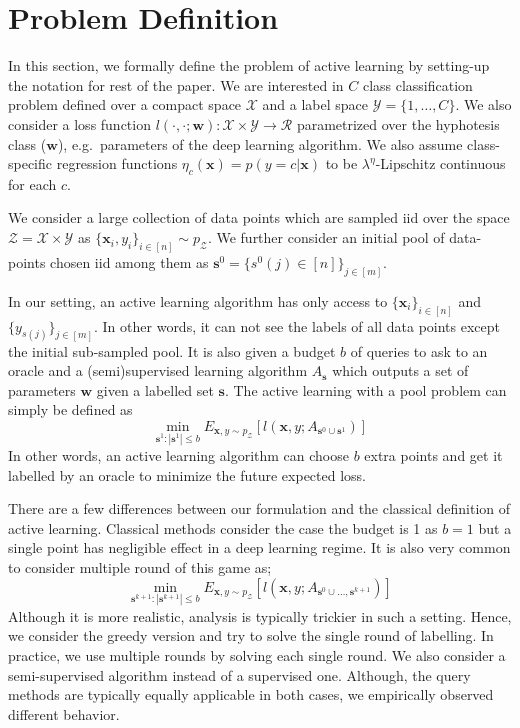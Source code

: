 \documentclass{article}
\begin{document}
\section{Problem Definition}
In this section, we formally define the problem of active learning by setting-up the notation for rest of the paper. We are interested in $C$ class classification problem defined over a compact space $\mathcal{X}$ and a label space  $\mathcal{Y}=\{1,\ldots,C\}$. We also consider a loss function $l(\cdot,\cdot;\mathbf{w}):\mathcal{X}\times \mathcal{Y} \rightarrow \mathcal{R}$ parametrized over the hyphotesis class ($\mathbf{w}$), e.g.\ parameters of the deep learning algorithm. We also assume class-specific regression functions $\eta_c(\mathbf{x})=p(y=c|\mathbf{x})$ to be \mbox{$\lambda^\eta$-Lipschitz} continuous for each $c$.

We consider a large collection of data points which are sampled iid over the space  $\mathcal{Z}=\mathcal{X}\times\mathcal{Y}$ as \mbox{$\{\mathbf{x}_i,y_i\}_{i \in [n]} \sim p_\mathcal{Z}$}. We further consider an initial pool of data-points chosen iid among them as \mbox{$\mathbf{s}^0=\{s^0(j) \in [n]\}_{j \in [m]}$}. 

In our setting, an active learning algorithm has only access to $\{\mathbf{x}_i\}_{i \in [n]}$ and $\{y_{s(j)}\}_{j \in [m] }$. In other words, it can not see the labels of all data points except the initial sub-sampled pool. It is also given a budget $b$ of queries to ask to an oracle and a (semi)supervised learning algorithm $A_{\mathbf{s}}$ which outputs a set of parameters $\mathbf{w}$ given a labelled set $\mathbf{s}$. The active learning with a pool problem can simply be defined as
\begin{equation}
\min_{\mathbf{s}^1 : |\mathbf{s}^1| \leq b} E_{\mathbf{x},y \sim p_\mathcal{Z}} [l(\mathbf{x},y; A_{\mathbf{s}^0 \cup \mathbf{s}^1})]
\end{equation}
In other words, an active learning algorithm can choose $b$ extra points and get it labelled by an oracle to minimize the future expected loss.

There are a few differences between our formulation and the classical definition of active learning. Classical methods consider the case the budget is 1 as $b=1$ but a single point has negligible effect in a deep learning regime. It is also very common to consider multiple round of this game as;
\begin{equation}
\min_{\mathbf{s}^{k+1} : |\mathbf{s}^{k+1}| \leq b} E_{\mathbf{x},y \sim p_\mathcal{Z}} [l(\mathbf{x},y; A_{\mathbf{s}^{0} \cup \ldots, \mathbf{s}^{k+1}})]
\end{equation}
Although it is more realistic, analysis is typically trickier in such a setting. Hence, we consider the greedy version and try to solve the single round of labelling. In practice, we use multiple rounds by solving each single round. We also consider a semi-supervised algorithm instead of a supervised one. Although, the query methods are typically equally applicable in both cases, we empirically observed different behavior.
\end{document}
